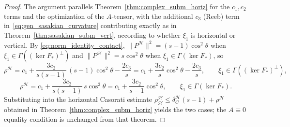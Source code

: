 \documentclass[10pt,a4paper]{amsart}
\newcommand{\calH}{\mathcal{H}}
\begin{document}
\begin{proof}
The argument parallels Theorem~\ref{thm:complex_subm_horiz} for the
$c_1,c_2$ terms and the optimization of the $A$-tensor, with the
additional $c_3$ (Reeb) term in~\eqref{eq:gen_sasakian_curvature}
contributing exactly as in Theorem~\ref{thm:sasakian_subm_vert},
according to whether $\xi_1$ is horizontal or vertical. By
\eqref{eq:norm_identity_contact},
$\|P^{\calH}\|^2=(s-1)\cos^2\theta$ when $\xi_1\in\Gamma((\ker F_*)^{\perp})$
and $\|P^{\calH}\|^2=s\cos^2\theta$ when $\xi_1\in\Gamma(\ker F_*)$, so
\[
\rho^{\calH}
= c_1+\frac{3c_2}{s(s-1)}\,(s-1)\cos^2\theta-\frac{2c_3}{s}
= c_1+\frac{3c_2}{s}\cos^2\theta-\frac{2c_3}{s},
\qquad \xi_1\in\Gamma((\ker F_*)^{\perp}),
\]
\[
\rho^{\calH}
= c_1+\frac{3c_2}{s(s-1)}\,s\cos^2\theta
= c_1+\frac{3c_2}{s-1}\cos^2\theta,
\qquad \xi_1\in\Gamma(\ker F_*).
\]
Substituting into the horizontal Casorati estimate
$\rho_{\calH}^{\calH}\leq\delta_C^{\calH}(s-1)+\rho^{\calH}$ obtained in
Theorem~\ref{thm:complex_subm_horiz} yields the two cases; the
$A\equiv0$ equality condition is unchanged from that theorem.
\end{proof}
\end{document}
